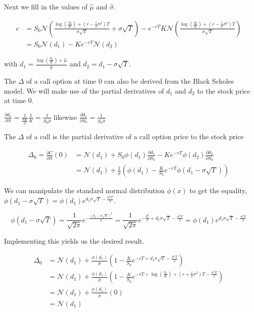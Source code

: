 \documentclass[11pt,a4paper]{article}
\begin{document}
Next we fill in the values of $\hat{\mu}$ and $\hat{\sigma}$.

\begin{align}
\label{eq:callprice}
c&= S_0 \mathcal{N}\left(\frac{\log\left(\frac{S_0}{K}\right)+\left(r-\frac{1}{2}\sigma^2\right)T}{\sigma\sqrt{T}}+\sigma\sqrt{T}\right)-e^{-rT}K\mathcal{N}\left(\frac{\log\left(\frac{S_0}{K}\right)+\left(r-\frac{1}{2}\sigma^2\right)T}{\sigma\sqrt{T}}\right)\nonumber \\
&=S_0\mathcal{N}(d_1)-Ke^{-rT}\mathcal{N}(d_2)
\end{align}

with $d_1=\frac{\log\left(\frac{S_0}{K}\right)+\hat{\mu}}{\hat{\sigma}}$ and $d_2=d_1-\sigma \sqrt{T}$.

The $\Delta$ of a call option at time 0 can also be derived from the Black Scholes model. We will make use of the partial derivatives of $d_1$ and $d_2$ to the stock price at time 0.

$\frac{\partial d_1}{\partial S}=\frac{1}{\frac{{S}{K}}{\hat{\sigma}}}\frac{1}{K}=\frac{1}{S_0\hat{\sigma}}$ likewise $\frac{\partial d_1}{\partial S_0}=\frac{1}{S_0\hat{\sigma}}$

The $\Delta$ of a call is the partial derivative of a call option price to the stock price

\begin{align}
\Delta_0=\frac{\partial C}{\partial S}(0)&=\mathcal{N}(d_1)+S_0\phi(d_1)\frac{\partial d_1}{\partial S_0}-Ke^{-rT}\phi(d_2)\frac{\partial d_2}{\partial S_0}\nonumber \\
&=\mathcal{N}(d_1)+\frac{1}{\hat{\sigma}}\left(\phi(d_1)-\frac{K}{S_0}e^{-rT}\phi(d_1-\sigma\sqrt{T})\right)
\end{align}

We can manipulate the standard normal distribution $\phi(x)$ to get the equality, $\phi(d_1-\sigma \sqrt{T})=\phi(d_1)e^{d_1\sigma\sqrt{T}-\frac{\sigma^2T}{2}}$.

\begin{equation}
\phi(d_1-\sigma \sqrt{T})=\frac{1}{\sqrt{2\pi}}e^{-\frac{(d_1-\sigma\sqrt{T})^2}{2}}=\frac{1}{\sqrt{2\pi}}e^{-\frac{d_1^2}{2}+d_1\sigma\sqrt{T}-\frac{\sigma^2T}{2}}=\phi(d_1)e^{d_1\sigma\sqrt{T}-\frac{\sigma^2T}{2}}
\end{equation}

Implementing this yields us the desired result.

\begin{align}
\label{eq:delta}
\Delta_0&=\mathcal{N}(d_1)+\frac{\phi(d_1)}{\hat{\sigma}}\left(1-\frac{K}{S_0}e^{-rT+d_1\sigma\sqrt{T}-\frac{\sigma^2T}{2}}\right)\nonumber \\
&=\mathcal{N}(d_1)+\frac{\phi(d_1)}{\hat{\sigma}}\left(1-\frac{K}{S_0}e^{-rT+\log\left(\frac{S_0}{K}\right)+(r+\frac{1}{2}\sigma^2)T-\frac{\sigma^2T}{2}}\right)\nonumber \\
&=\mathcal{N}(d_1)+\frac{\phi(d_1)}{\hat{\sigma}}(0)\nonumber \\
&=\mathcal{N}(d_1)
\end{align}
\end{document}
